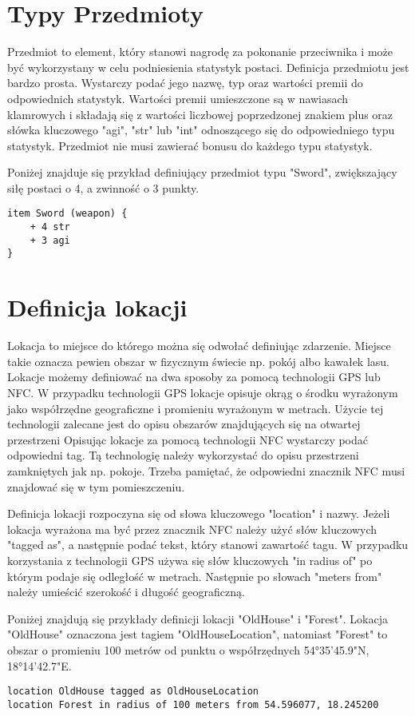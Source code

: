 \documentclass	{xmgr}
\begin{document}
\section{Typy Przedmioty}
Przedmiot to element, który stanowi nagrodę za pokonanie przeciwnika i może być wykorzystany w celu podniesienia statystyk postaci. 
Definicja przedmiotu jest bardzo prosta. Wystarczy podać jego nazwę, typ oraz wartości premii do odpowiednich statystyk.
Wartości premii umieszczone są w nawiasach klamrowych i składają się z wartości liczbowej poprzedzonej znakiem plus oraz słówka kluczowego "agi", "str" lub "int" odnoszącego się do odpowiedniego typu statystyk. Przedmiot nie musi zawierać bonusu do każdego typu statystyk.

Poniżej znajduje się przykład definiujący przedmiot typu "Sword", zwiększający siłę postaci o 4, a zwinność o 3 punkty.
\begin{lstlisting}
item Sword (weapon) {
	+ 4 str
	+ 3 agi
}
\end{lstlisting}

\section{Definicja lokacji}
Lokacja to miejsce do którego można się odwołać definiując zdarzenie. Miejsce takie oznacza pewien obszar w fizycznym świecie np. pokój albo kawałek lasu. Lokacje możemy definiować na dwa sposoby za pomocą technologii GPS lub NFC. 
W przypadku technologii GPS lokacje opisuje okrąg o środku wyrażonym jako współrzędne geograficzne i promieniu wyrażonym w metrach. Użycie tej technologii zalecane jest do opisu obszarów znajdujących się na otwartej przestrzeni 
Opisując lokacje za pomocą technologii NFC wystarczy podać odpowiedni tag. Tą technologię należy wykorzystać do opisu przestrzeni zamkniętych jak np. pokoje. Trzeba pamiętać, że odpowiedni znacznik NFC musi znajdować się w tym pomieszczeniu.

Definicja lokacji rozpoczyna się od słowa kluczowego "location" i nazwy. Jeżeli lokacja wyrażona ma być przez znacznik NFC należy użyć słów kluczowych "tagged as", a następnie podać tekst, który stanowi zawartość tagu. W przypadku korzystania z technologii GPS używa się słów kluczowych "in radius of" po którym podaje się odległość w metrach. Następnie po słowach "meters from" należy umieścić szerokość i długość geograficzną.

Poniżej znajdują się przykłady definicji lokacji "OldHouse" i "Forest". Lokacja "OldHouse" oznaczona jest tagiem "OldHouseLocation", natomiast 
"Forest" to obszar o promieniu 100 metrów od punktu o współrzędnych 54°35'45.9"N, 18°14'42.7"E.
\begin{lstlisting}
location OldHouse tagged as OldHouseLocation
location Forest in radius of 100 meters from 54.596077, 18.245200
\end{lstlisting}
\end{document}
